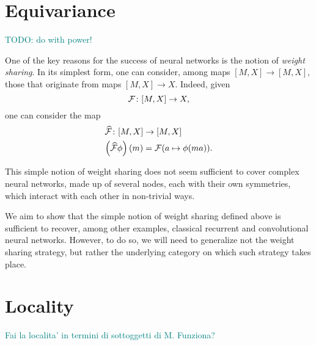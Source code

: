 \documentclass[12pt]{article}
\newcommand{\pietro}[1]{\textcolor{teal}{#1}}
\newcommand{\Mon}{{\mathbf{Mon}}}
\newcommand{\Cat}{{\mathbf{C}}}
\begin{document}
\section{Equivariance}

\pietro{TODO: do with power!}

One of the key reasons for the success of neural networks is the notion of {\em weight sharing}. In its simplest form, one can consider, among maps $[M, X] \rightarrow [M, X]$, those that originate from maps $[M, X] \rightarrow X$. Indeed, given
\begin{equation*}
    {\cal F} \colon [M, X] \rightarrow X,
\end{equation*}
one can consider the map
\begin{align*}
    \widehat{\cal F} \colon [M, X] &\rightarrow [M, X] \\
    \left(\widehat{\cal F}\phi\right)(m) &= {\cal F}(a \mapsto \phi(ma)).
\end{align*}

This simple notion of weight sharing does not seem sufficient to cover complex neural networks, made up of several nodes, each with their own symmetries, which interact with each other in non-trivial ways.

We aim to show that the simple notion of weight sharing defined above is sufficient to recover, among other examples, classical recurrent and convolutional neural networks. However, to do so, we will need to generalize not the weight sharing strategy, but rather the underlying category on which such strategy takes place.

\section{Locality}

\pietro{Fai la localita' in termini di sottoggetti di M. Funziona?}


\end{document}
